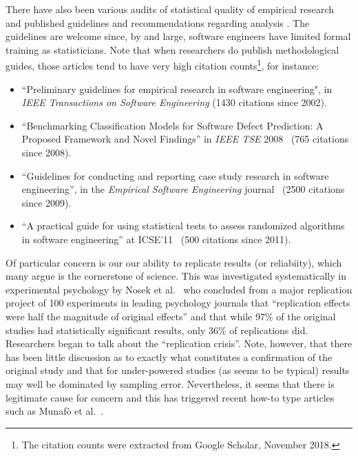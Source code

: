 \documentclass[preprint,10pt]{elsarticle}
\newcommand{\bi}{\begin{itemize}}
\newcommand{\ei}{\end{itemize}}
\begin{document}
There have also been various audits of statistical quality of empirical research \cite{Kitc02} and published guidelines and recommendations regarding analysis \cite{Kitc02,Wohl12}. The guidelines are welcome since, by and large, software engineers have limited formal training as statisticians.  Note that when researchers do publish methodological guides, those articles tend to have very high citation counts\footnote{The citation counts were extracted from Google Scholar, November 2018.}, for instance:
\bi
\item ``Preliminary guidelines for empirical research in software engineering", in \textit{IEEE Transactions on Software Engineering} \cite{Kitc02} (1430 citations since 2002).
\item ``Benchmarking Classification Models for Software Defect Prediction: A Proposed Framework and Novel Findings'' in \textit{IEEE TSE} 2008~\cite{Lessmann08} (765 citations since 2008).
\item
``Guidelines for conducting and reporting case study research in software engineering'', 
  in the \textit{Empirical Software Engineering} journal~\cite{runeson2009guidelines} (2500 citations since 2009).
\item ``A practical guide for using statistical tests to assess randomized algorithms in software engineering'' at ICSE'11~\cite{Arcuri:2011} (500 citations since 2011).
\ei

Of particular concern is our our ability to replicate results (or reliabiity), which many argue is the cornerstone of science.  This was investigated systematically in experimental psychology by Nosek et al.~\cite{Open15} who concluded from a major replication project of 100 experiments in leading psychology journals that ``replication effects were half the magnitude of original effects'' and that while 97\% of the original studies had statistically significant results, only 36\% of replications did.  Researchers began to talk about the ``replication crisis''.  Note, however, that there has been little discussion as to exactly what constitutes a confirmation of the original study \cite{Spen16} and that for under-powered studies (as seems to be typical) results may well be dominated by sampling error.  Nevertheless, it seems that there is legitimate cause for concern and this has triggered recent how-to type articles such as Munaf{\`o} et al.~\cite{Muna17}.
\end{document}
